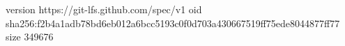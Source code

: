 version https://git-lfs.github.com/spec/v1
oid sha256:f2b4a1adb78bd6eb012a6bcc5193c0f0d703a430667519ff75ede8044877ff77
size 349676
